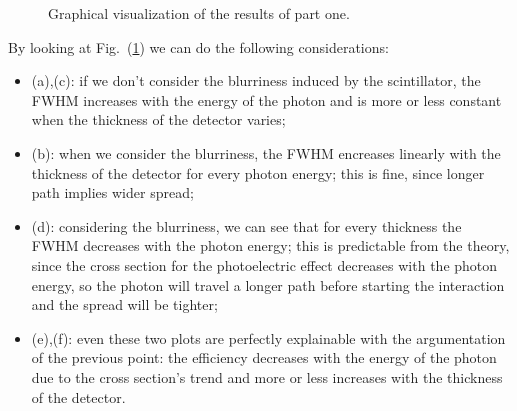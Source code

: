 \documentclass[a4paper]{article}
\begin{document}
\begin{figure}[!htb]
  \quad
  \caption{Graphical visualization of the results of part one.}
  \label{fig:results_one}
\end{figure}
By looking at Fig.~(\ref{fig:results_one}) we can do the following considerations:
\begin{itemize}
  \item (a),(c): if we don't consider the blurriness induced by the scintillator, the FWHM increases with the energy of the photon and is more or less constant when the thickness of the detector varies;
  \item (b): when we consider the blurriness, the FWHM encreases linearly with the thickness of the detector for every photon energy; this is fine, since longer path implies wider spread;
  \item (d): considering the blurriness, we can see that for every thickness the FWHM decreases with the photon energy; this is predictable from the theory, since the cross section for the photoelectric effect decreases with the photon energy, so the photon will travel a longer path before starting the interaction and the spread will be tighter;
  \item (e),(f): even these two plots are perfectly explainable with the argumentation of the previous point: the efficiency decreases with the energy of the photon due to the cross section's trend and more or less increases with the thickness of the detector.
\end{itemize}
\end{document}
